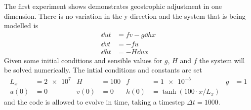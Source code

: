\documentclass[a4paper, sfsidenotes, twoside]{tufte-handout}
\begin{document}
  The first experiment shows demonstrates geostrophic adjustment in one dimension.
  There is no variation in the y-direction and the system that is being modelled is
  \begin{subequations}
    \begin{align}
      \dd{u}{t} &= fv - g \dd{h}{x} \\
      \dd{v}{t} &= -fu \\
      \dd{h}{t} &= -  H\dd{u}{x}
    \end{align}
  \end{subequations}
  Given some initial conditions and sensible values for $g$, $H$ and $f$ the system will be solved numerically.
  The intial conditions and constants are set
  \begin{align*}
    L_x &= \num{2e7} & H &= \num{100} & f &= \num{1e-5} & g &= \num{1} \\
    u(0) &= 0  & v(0) &= 0 & h(0) &= \tanh(100 \cdot x / L_x)
  \end{align*}
  and the code is allowed to evolve in time, taking a timestep $\Delta t = 1000$.
\end{document}
